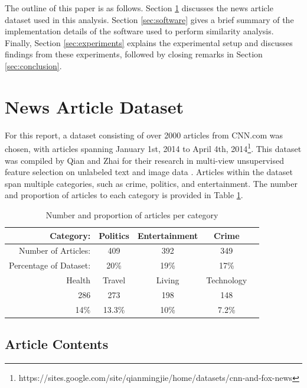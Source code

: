 \documentclass[11pt]{article}
\begin{document}
The outline of this paper is as follows.
Section \ref{sec:dataset} discusses the news article dataset used in this analysis.
Section \ref{sec:software} gives a brief summary of the implementation details of the software used to perform similarity analysis.
Finally, Section \ref{sec:experiments} explains the experimental setup and discusses findings from these experiments, followed by closing remarks in Section \ref{sec:conclusion}.


\section{News Article Dataset} \label{sec:dataset}

For this report, a dataset consisting of over 2000 articles from CNN.com was chosen, with articles spanning January 1st, 2014 to April 4th, 2014\footnote{
https://sites.google.com/site/qianmingjie/home/datasets/cnn-and-fox-news
}.
This dataset was compiled by Qian and Zhai for their research in multi-view unsupervised feature selection on unlabeled text and image data \cite{qian2014unsupervised}.
Articles within the dataset span multiple categories, such as crime, politics, and entertainment.
The number and proportion of articles to each category is provided in Table \ref{tab:categories}.

\begin{table}[h]
	\centering
	\begin{tabular}{ r c c c c  }
		\hline
	Category: &              Politics & Entertainment & Crime & \\ \hline
	Number of Articles: &    409 &      392 &           349 & \\ \hline
	Percentage of Dataset: & 20\% &    19\% &           17\% & \\
	  \hline
	  \hline
	   Health & Travel & Living & Technology \\ \hline
	   286    & 273    & 198    & 148 \\ \hline
	   14\%   & 13.3\% & 10\%   & 7.2\% \\
	\hline
	\end{tabular}
	
	\caption{Number and proportion of articles per category}
	\label{tab:categories}
\end{table}


\subsection{Article Contents}
\end{document}
